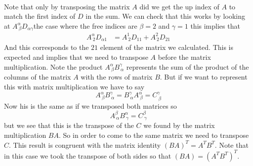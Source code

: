 \documentclass[11pt]{article}
\numberwithin{equation}{section}
\begin{document}
\begin{enumerate}[(a)]
\begin{align*}
\end{align*}
Note that only by transposing the matrix $A$ did we get the up index of $A$ to match the first index of $D$ in the sum. We can check that this works by looking at $A^{\alpha}_{\ \beta}D_{\alpha\gamma}$the case where the free indices are $\beta =2 $ and $\gamma = 1$ this implies that
\begin{align*}
A^{\alpha}_{\ 2}D_{\alpha1} &= A^{1}_{\ 2}D_{11} + A^{2}_{\ 2}D_{21} 
\end{align*}
And this corresponds to the $21$ element of the matrix we calculated. This is expected and implies that we need to transpose $A$ before the matrix multiplication. Note the product $A^{\alpha}_{\ \beta}B^{\gamma}_{\ \alpha}$ represents the sum of the product of the columns of the matrix $A$ with the rows of matrix $B$. But if we want to represent this with matrix multiplication we have to say
$$A^{\alpha}_{\ \beta}B^{\gamma}_{\ \alpha} = B^{\gamma}_{\ \alpha}A^{\alpha}_{\ \beta} = C^{\gamma}_{\ \beta}$$
Now his is the same as if we transposed both matrices so
$$A^{\beta}_{\ \alpha}B^{\alpha}_{\ \gamma} =  C^{\beta}_{\ \gamma}$$
but we see that this is the transpose of the $C$ we found by the matrix multiplication $BA$. So in order to come to the same matrix we need to transpose $C$. This result is congruent with the matrix identity $(BA)^T = A^TB^T$. Note that in this case we took the transpose of both sides so that $(BA) = (A^TB^T)^T$.


\end{enumerate}
\end{document}
